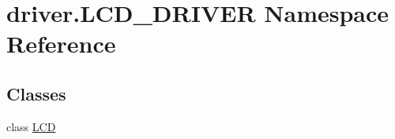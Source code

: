\hypertarget{namespacedriver_1_1LCD__DRIVER}{}\section{driver.\+L\+C\+D\+\_\+\+D\+R\+I\+V\+E\+R Namespace Reference}
\label{namespacedriver_1_1LCD__DRIVER}
\subsection*{Classes}
\begin{DoxyCompactItemize}
\item 
class \hyperlink{classdriver_1_1LCD__DRIVER_1_1LCD}{L\+C\+D}
\end{DoxyCompactItemize}
